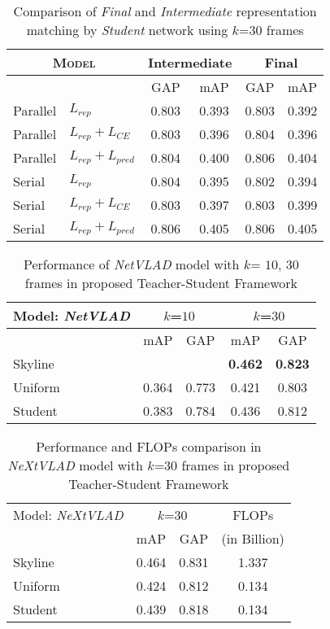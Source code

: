 \documentclass[10pt,twocolumn,letterpaper]{article}
\begin{document}
\begin{table}[t]
\centering
\begin{tabular}{ll|cc|cc}
\toprule
\multicolumn{2}{c}{\textsc{Model}}  & \multicolumn{2}{c}{Intermediate} & \multicolumn{2}{c}{Final}\ \\
\toprule
\multicolumn{2}{c|}{ }  & \textsc{GAP} & m\textsc{AP} & \textsc{GAP} & m\textsc{AP} \\
\toprule
Parallel & $L_{rep}$ & 0.803 & 0.393 & 0.803 & 0.392\\
Parallel & $L_{rep} + L_{CE}$ & 0.803 &	0.396 & 0.804 & 0.396\\
Parallel & $L_{rep} + L_{pred}$ &	0.804 &	0.400 & 0.806 & 0.404\\
\midrule
Serial & $L_{rep}$ & 0.804 & 0.395 & 0.802 & 0.394\\
Serial & $L_{rep} + L_{CE}$ & 0.803	& 0.397 & 0.803 & 0.399\\
Serial & $L_{rep} + L_{pred}$ &	0.806 &	0.405 & 0.806 & 0.405\\
\bottomrule
\end{tabular}
\caption{Comparison of \textit{Final} and \textit{Intermediate} representation matching by \textit{Student} network using $k$=$30$ frames}
\label{tab-intermediate}
\end{table}




\begin{table}[t]
\centering
\begin{tabular}{l|cc|cc}
\toprule
  Model: \textit{NetVLAD} &  \multicolumn{ 2}{c|}{$k$=$10$} & \multicolumn{ 2}{c}{$k$=$30$} \\
\toprule
          &  mAP & GAP & mAP & GAP\\  
\midrule
  Skyline &      &     & \textbf{0.462} & \textbf{0.823} \\
  \midrule
  Uniform & 0.364 & 0.773 & 0.421 & 0.803 \\
  \midrule
  Student & 0.383 & 0.784 & 0.436 & 0.812  \\
 \bottomrule
\end{tabular}
\caption{Performance of \textit{NetVLAD} model with $k$= $10$, $30$ frames in proposed Teacher-Student Framework}
\label{tab-netvlad}
\end{table}

\begin{table}[t]
\centering
\begin{tabular}{l|cc|c}
\toprule
  Model: \textit{NeXtVLAD} &  \multicolumn{ 2}{c|}{$k$=$30$} & FLOPs \\
          &  mAP & GAP & (in Billion) \\
\midrule
  Skyline &  0.464 & 0.831 & 1.337 \\
  \midrule
  Uniform & 0.424 & 0.812 & 0.134 \\
  \midrule
  Student & 0.439 & 0.818 & 0.134 \\
 \bottomrule
\end{tabular}
\caption{Performance and FLOPs comparison in \textit{NeXtVLAD} model with $k$=$30$ frames in proposed Teacher-Student Framework}
\label{tab-nextvlad}
\end{table}
\end{document}
